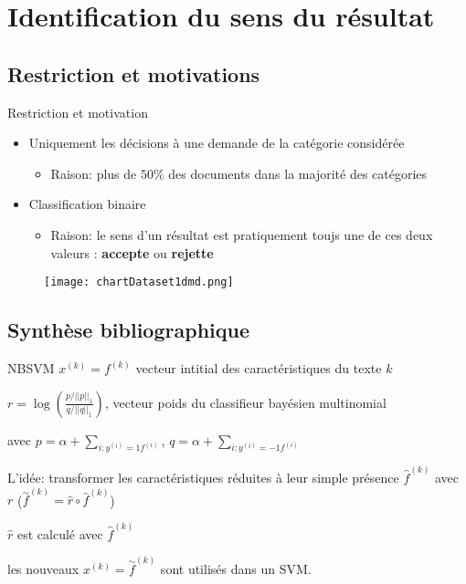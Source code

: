 \section{Identification du sens du résultat}
\subsection{Restriction et motivations}
\begin{frame}{Restriction et motivation}
\begin{itemize}
	\item Uniquement les décisions à une demande de la catégorie considérée
	\begin{itemize}
		\item Raison: plus de $50\%$ des documents dans la majorité des catégories
	\end{itemize}
	\item Classification binaire
	\begin{itemize}
		\item Raison: le sens d'un résultat est pratiquement toujs une de ces deux valeurs : \textbf{accepte} ou \textbf{rejette}
	\end{itemize}
\end{itemize}
\begin{figure}
	\texttt{[image: chartDataset1dmd.png]}
\end{figure}
\end{frame}

%
\subsection{Synthèse bibliographique}

\begin{frame}{NBSVM \cite{wang2012nbsvm}}
$x^{(k)} = f^{(k)}$ vecteur intitial des caractéristiques du texte $k$

$r = \log \left( \frac{p/\vert\vert p \vert\vert_1}{q / \vert\vert q \vert\vert_1}\right)$, vecteur poids du classifieur bayésien multinomial

avec $p=\alpha + \sum_{i:y^{(i)}=1f^{(i)}}$, $q=\alpha + \sum_{i:y^{(i)}=-1f^{(i)}}$

L'idée: transformer les caractéristiques réduites à leur simple présence $\widehat{f}^{(k)}$ avec $r$ ($\overset{\sim}{f}^{(k)} = \widehat{r} \circ \widehat{f}^{(k)}$)

$\widehat{r}$ est calculé avec $\widehat{f}^{(k)}$

les nouveaux $x^{(k)} = \overset{\sim}{f}^{(k)}$ sont utilisés dans un SVM.

\end{frame}

